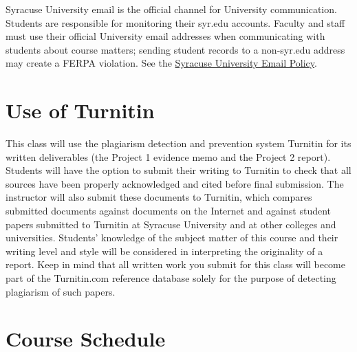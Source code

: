 \documentclass[11pt]{article}
\begin{document}
Syracuse University email is the official channel for University communication. Students are
responsible for monitoring their syr.edu accounts. Faculty and staff must use their official
University email addresses when communicating with students about course matters; sending
student records to a non-syr.edu address may create a FERPA violation. See the
\href{https://policies.syr.edu/policies/information-technology/e-mail-policy/}{Syracuse
University Email Policy}.

\section{Use of Turnitin}

This class will use the plagiarism detection and prevention system Turnitin for its written
deliverables (the Project 1 evidence memo and the Project 2 report). Students will have the
option to submit their writing to Turnitin to check that all sources have been properly
acknowledged and cited before final submission. The instructor will also submit these
documents to Turnitin, which compares submitted documents against documents on the Internet
and against student papers submitted to Turnitin at Syracuse University and at other colleges
and universities. Students' knowledge of the subject matter of this course and their writing
level and style will be considered in interpreting the originality of a report. Keep in mind
that all written work you submit for this class will become part of the Turnitin.com reference
database solely for the purpose of detecting plagiarism of such papers.

\newpage
\section{Course Schedule}

\end{document}
